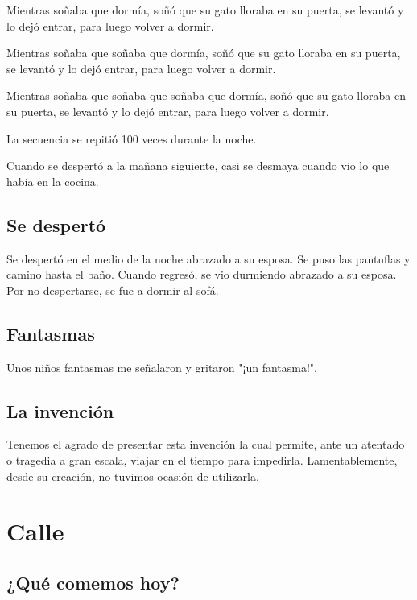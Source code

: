 \documentclass[11pt,twoside,openright,a6paper]{book}
\begin{document}
Mientras soñaba que dormía, soñó que su gato lloraba en su puerta, se levantó y lo dejó entrar, para luego volver a dormir.

Mientras soñaba que soñaba que dormía, soñó que su gato lloraba en su puerta, se levantó y lo dejó entrar, para luego volver a dormir.

Mientras soñaba que soñaba que soñaba que dormía, soñó que su gato lloraba en su puerta, se levantó y lo dejó entrar, para luego volver a dormir.

La secuencia se repitió 100 veces durante la noche.

Cuando se despertó a la mañana siguiente, casi se desmaya cuando vio lo que había en la cocina.

\chapter*{Se despertó}

Se despertó en el medio de la noche abrazado a su esposa. Se puso las pantuflas y camino hasta el baño. Cuando regresó, se vio durmiendo abrazado a su esposa. Por no despertarse, se fue a dormir al sofá.

\chapter*{Fantasmas}

Unos niños fantasmas me señalaron y gritaron "¡un fantasma!".

\chapter*{La invención}


Tenemos el agrado de presentar esta invención la cual permite, ante un atentado o tragedia a gran escala, viajar en el tiempo para impedirla. Lamentablemente, desde su creación, no tuvimos ocasión de utilizarla.

\part*{Calle}

\chapter*{¿Qué comemos hoy?}
\end{document}
